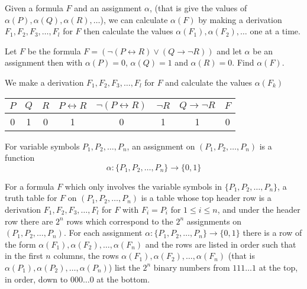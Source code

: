 
Given a formula $F$ and an assignment $\alpha$, (that is give the values of $\alpha (P), \alpha (Q), \alpha (R),\dots$), we can calculate $\alpha (F)$ by making a derivation $F_1,F_2,F_3,\dots ,F_l$ for $F$ then calculate the values $\alpha (F_1), \alpha (F_2) ,\dots$ one at a time.

\begin{exmp}
Let $F$ be the formula $F = (\neg (P\leftrightarrow R)\vee (Q\to \neg R))$ and let $\alpha$ be an assignment then with $\alpha (P) = 0$, $\alpha (Q) = 1$ and $\alpha (R)=0$. Find $\alpha (F)$.

We make a derivation $F_1,F_2,F_3,\dots ,F_l$ for $F$ and calculate the values $\alpha (F_k)$

\begin{center}
\begin{tabular}{c|c|c|c|c|c|c|c}
    $P$ & $Q$ & $R$ & $P\leftrightarrow R$ & $\neg (P\leftrightarrow R)$ & $\neg R$ & $Q\to \neg R$ & $F$ \\ \hline
    0 & 1 & 0 & 1 & 0 & 1 & 1 & 0 \\
\end{tabular}
\end{center}
\end{exmp}

\begin{defn}
For variable symbols $P_1,P_2,\dots ,P_n$, an assignment on $(P_1,P_2,\dots ,P_n)$ is a function $$\alpha \colon \{P_1,P_2,\dots ,P_n\}\to \{0,1\}$$

For a formula $F$ which only involves the variable symbols in $\{P_1,P_2,\dots ,P_n\}$, a truth table for $F$ on $(P_1,P_2,\dots ,P_n)$ is a table whose top header row is a derivation $F_1,F_2,F_3,\dots ,F_l$ for $F$ with $F_i=P_i$ for $1\leq i \leq n $, and under the header row there are $2^n$ rows which correspond to the $2^n$ assignments on $(P_1,P_2,\dots ,P_n)$. For each assignment $\alpha \colon \{P_1,P_2,\dots ,P_n\}\to \{0,1\}$ there is a row of the form $\alpha (F_1),\alpha (F_2),\dots ,\alpha (F_n)$ and the rows are listed in order such that in the first $n$ columns, the rows $\alpha (F_1),\alpha (F_2),\dots ,\alpha (F_n)$ (that is $\alpha (P_1),\alpha (P_2),\dots ,\alpha (P_n)$) list the $2^n$ binary numbers from $111\dots 1$ at the top, in order, down to $000\dots 0$ at the bottom.

\end{defn}

